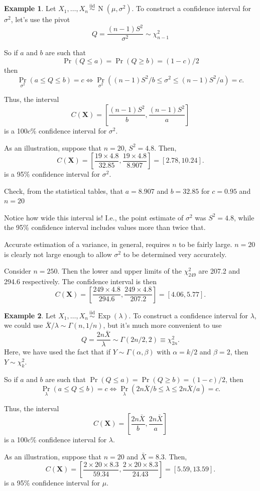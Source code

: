 \documentclass[
]{book}
\newcommand{\bX}{{\boldsymbol X}}
\DeclareMathOperator{\N}{N}
\DeclareMathOperator{\Exp}{Exp}
\newcommand{\iid}{\,\overset{\text{iid}}{\sim}\,}
\theoremstyle{definition}
\theoremstyle{definition}
\newtheorem{example}{Example}[chapter]
\theoremstyle{definition}
\theoremstyle{definition}
\theoremstyle{remark}
\begin{document}
\begin{example}
\protect\hypertarget{exm:normvar}{}\label{exm:normvar}Let \(X_1,\dots,X_n\iid \N(\mu,\sigma^2)\). To construct a confidence interval for \(\sigma^2\), let's use the pivot
\[
Q =  \frac{(n-1)S^2}{\sigma^2} \sim \chi^2_{n-1}
\]

So if \(a\) and \(b\) are such that
\[
\Pr(Q \leq a) = \Pr(Q \geq b) = (1-c)/2
\]
then
\[
\Pr_{\sigma^2}\left(a \leq Q \leq b \right) = c \Leftrightarrow \Pr_{\sigma^2} \left((n-1)S^2/b \leq \sigma^2 \leq (n-1)S^2/a  \right) = c.
\]

Thus, the interval
\[
C(\bX) = \left[\frac{(n-1)S^2}{b}, \frac{(n-1)S^2}{a} \right]
\]
is a 100\(c\)\% confidence interval for \(\sigma^2\).

As an illustration, suppose that \(n=20\), \(S^2 =4.8\). Then,
\[
C(\bX) = \left[\frac{19 \times 4.8}{32.85}, \frac{19 \times 4.8}{8.907} \right] = [2.78, 10.24].
\]
is a 95\% confidence interval for \(\sigma^2\).
\end{example}

Check, from the statistical tables, that \(a=8.907\) and \(b=32.85\) for \(c=0.95\) and \(n=20\)

Notice how wide this interval is! I.e., the point estimate of \(\sigma^2\) was \(S^2=4.8\), while the 95\% confidence interval includes values more than twice that.

Accurate estimation of a variance, in general, requires \(n\) to be fairly large.
\(n=20\) is clearly not large enough to allow \(\sigma^2\) to be determined very accurately.

Consider \(n=250\). Then the lower and upper limits of the \(\chi^2_{249}\) are 207.2 and 294.6 respectively.
The confidence interval is then
\[
C(\bX) = \left[\frac{249 \times 4.8}{294.6}, \frac{249 \times 4.8}{207.2} \right] = [4.06, 5.77].
\]

\begin{example}
Let \(X_1,\dots,X_n\iid \Exp(\lambda)\). To construct a confidence interval for \(\lambda\), we could use \(\bar X / \lambda \sim \Gamma(n,1/n)\), but it's much more convenient to use
\[
Q = \frac{2n\bar X}{\lambda} \sim \Gamma(2n/2, 2) \equiv \chi^2_{2n}.
\]
Here, we have used the fact that if \(Y\sim\Gamma(\alpha,\beta)\) with \(\alpha=k/2\) and \(\beta=2\), then \(Y\sim\chi^2_k\).

So if \(a\) and \(b\) are such that \(\Pr(Q \leq a) = \Pr(Q \geq b) = (1-c)/2\), then
\[
\Pr_{\lambda}\left(a \leq Q \leq b \right) = c \Leftrightarrow \Pr_\lambda \left(2n\bar X/b \leq \lambda \leq 2n\bar X/a  \right) = c.
\]

Thus, the interval
\[
C(\bX) = \left[\frac{2n\bar X}{b}, \frac{2n\bar X}{a} \right]
\]
is a 100\(c\)\% confidence interval for \(\lambda\).

As an illustration, suppose that \(n=20\) and \(\bar X =8.3\). Then,
\[
C(\bX) = \left[\frac{2\times 20 \times 8.3}{59.34}, \frac{2\times 20 \times 8.3}{24.43} \right] = [5.59, 13.59].
\]
is a 95\% confidence interval for \(\mu\).
\end{example}
\end{document}
